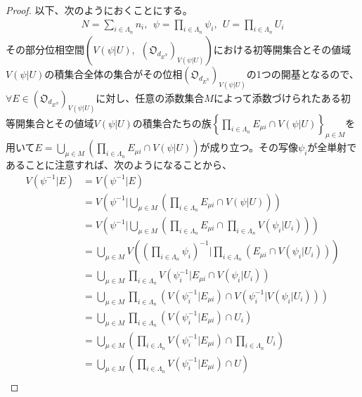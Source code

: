 \documentclass[dvipdfmx]{jsarticle}
\begin{document}
\begin{proof}
以下、次のようにおくことにする。
\begin{align*}
N = \sum_{i \in \varLambda_{n}} n_{i},\ \ \psi = \prod_{i \in \varLambda_{n}} \psi_{i},\ \ U = \prod_{i \in \varLambda_{n}} U_{i}
\end{align*}
その部分位相空間$\left( V\left( \psi|U \right),\ \ \left( \mathfrak{O}_{d_{E^{N}}} \right)_{V\left( \psi|U \right)} \right)$における初等開集合とその値域$V\left( \psi|U \right)$の積集合全体の集合がその位相$\left( \mathfrak{O}_{d_{E^{N}}} \right)_{V\left( \psi|U \right)}$の1つの開基となるので、$\forall E \in \left( \mathfrak{O}_{d_{E^{N}}} \right)_{V\left( \psi|U \right)}$に対し、任意の添数集合$M$によって添数づけられたある初等開集合とその値域$V\left( \psi|U \right)$の積集合たちの族$\left\{ \prod_{i \in \varLambda_{n}} E_{\mu i} \cap V\left( \psi|U \right) \right\}_{\mu \in M}$を用いて$E = \bigcup_{\mu \in M} \left( \prod_{i \in \varLambda_{n}} E_{\mu i} \cap V\left( \psi|U \right) \right)$が成り立つ。その写像$\psi_{i}$が全単射であることに注意すれば、次のようになることから、
\begin{align*}
V\left( \psi^{- 1}|E \right) &= V\left( \psi^{- 1}|E \right)\\
&= V\left( \psi^{- 1}|\bigcup_{\mu \in M} \left( \prod_{i \in \varLambda_{n}} E_{\mu i} \cap V\left( \psi|U \right) \right) \right)\\
&= V\left( \psi^{- 1}|\bigcup_{\mu \in M} \left( \prod_{i \in \varLambda_{n}} E_{\mu i} \cap \prod_{i \in \varLambda_{n}} {V\left( \psi_{i}|U_{i} \right)} \right) \right)\\
&= \bigcup_{\mu \in M} {V\left( \left( \prod_{i \in \varLambda_{n}} \psi_{i} \right)^{- 1}|\prod_{i \in \varLambda_{n}} \left( E_{\mu i} \cap V\left( \psi_{i}|U_{i} \right) \right) \right)}\\
&= \bigcup_{\mu \in M} {\prod_{i \in \varLambda_{n}} {V\left( \psi_{i}^{- 1}|E_{\mu i} \cap V\left( \psi_{i}|U_{i} \right) \right)}}\\
&= \bigcup_{\mu \in M} {\prod_{i \in \varLambda_{n}} \left( V\left( \psi_{i}^{- 1}|E_{\mu i} \right) \cap V\left( \psi_{i}^{- 1}|V\left( \psi_{i}|U_{i} \right) \right) \right)}\\
&= \bigcup_{\mu \in M} {\prod_{i \in \varLambda_{n}} \left( V\left( \psi_{i}^{- 1}|E_{\mu i} \right) \cap U_{i} \right)}\\
&= \bigcup_{\mu \in M} \left( \prod_{i \in \varLambda_{n}} {V\left( \psi_{i}^{- 1}|E_{\mu i} \right)} \cap \prod_{i \in \varLambda_{n}} U_{i} \right)\\
&= \bigcup_{\mu \in M} \left( \prod_{i \in \varLambda_{n}} {V\left( \psi_{i}^{- 1}|E_{\mu i} \right)} \cap U \right)\\

\end{align*}
\end{proof}
\end{document}
